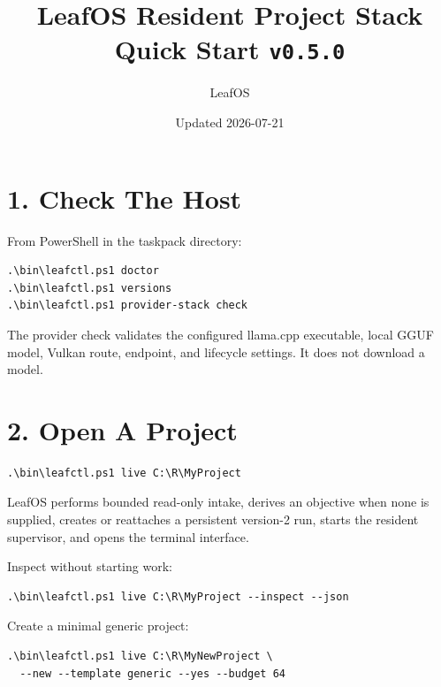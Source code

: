 \documentclass[11pt,a4paper]{article}
\title{\textbf{LeafOS Resident Project Stack}\\[5pt]\large Quick Start \texttt{v0.5.0}}
\author{LeafOS}
\date{Updated 2026-07-21}
\begin{document}
\maketitle

\begin{center}
\end{center}

\section*{1. Check The Host}

From PowerShell in the taskpack directory:

\begin{lstlisting}
.\bin\leafctl.ps1 doctor
.\bin\leafctl.ps1 versions
.\bin\leafctl.ps1 provider-stack check
\end{lstlisting}

The provider check validates the configured llama.cpp executable, local GGUF
model, Vulkan route, endpoint, and lifecycle settings. It does not download a
model.

\section*{2. Open A Project}

\begin{lstlisting}
.\bin\leafctl.ps1 live C:\R\MyProject
\end{lstlisting}

LeafOS performs bounded read-only intake, derives an objective when none is
supplied, creates or reattaches a persistent version-2 run, starts the resident
supervisor, and opens the terminal interface.

Inspect without starting work:

\begin{lstlisting}
.\bin\leafctl.ps1 live C:\R\MyProject --inspect --json
\end{lstlisting}

Create a minimal generic project:

\begin{lstlisting}
.\bin\leafctl.ps1 live C:\R\MyNewProject \
  --new --template generic --yes --budget 64
\end{lstlisting}
\end{document}
